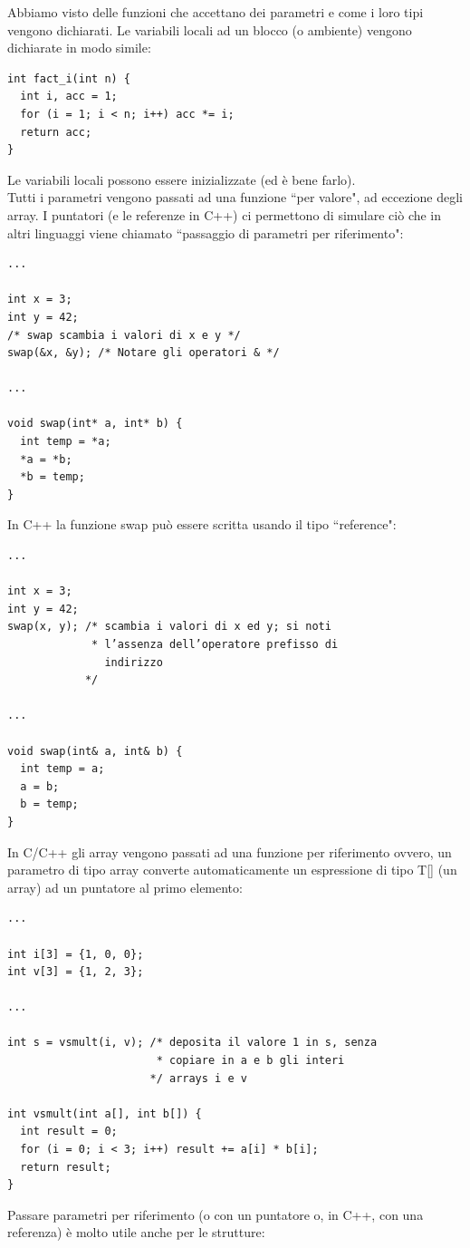 \documentclass[a4paper,12pt, oneside]{book}
\begin{document}
Abbiamo visto delle funzioni che accettano dei parametri e
come i loro tipi vengono dichiarati. Le variabili locali ad un blocco (o ambiente) vengono dichiarate in modo simile:
\begin{verbatim}
int fact_i(int n) {
  int i, acc = 1;
  for (i = 1; i < n; i++) acc *= i;
  return acc;
}
\end{verbatim}
Le variabili locali possono essere inizializzate (ed è bene farlo).\\
Tutti i parametri vengono passati ad una funzione “per valore", ad eccezione degli array. I puntatori (e le referenze in C++) ci permettono di simulare ciò che in
altri linguaggi viene chiamato “passaggio di parametri per riferimento":
\begin{verbatim}
...

int x = 3;
int y = 42; 
/* swap scambia i valori di x e y */
swap(&x, &y); /* Notare gli operatori & */

...

void swap(int* a, int* b) {
  int temp = *a;
  *a = *b;
  *b = temp;
}
\end{verbatim}
In C++ la funzione swap può essere scritta usando il tipo “reference":
\begin{verbatim}
...

int x = 3;
int y = 42;
swap(x, y); /* scambia i valori di x ed y; si noti 
             * l’assenza dell’operatore prefisso di
               indirizzo 
            */

...

void swap(int& a, int& b) {
  int temp = a;
  a = b;
  b = temp;
}
\end{verbatim}
In C/C++ gli array vengono passati ad una funzione per riferimento ovvero, un parametro di tipo array converte automaticamente un espressione di
tipo T[] (un array) ad un puntatore al primo elemento:
\begin{verbatim}
...

int i[3] = {1, 0, 0};
int v[3] = {1, 2, 3};

...

int s = vsmult(i, v); /* deposita il valore 1 in s, senza
                       * copiare in a e b gli interi
                      */ arrays i e v

int vsmult(int a[], int b[]) {
  int result = 0;
  for (i = 0; i < 3; i++) result += a[i] * b[i];
  return result;
}
\end{verbatim}
Passare parametri per riferimento (o con un puntatore o, in C++, con una
referenza) è molto utile anche per le strutture:
\end{document}
